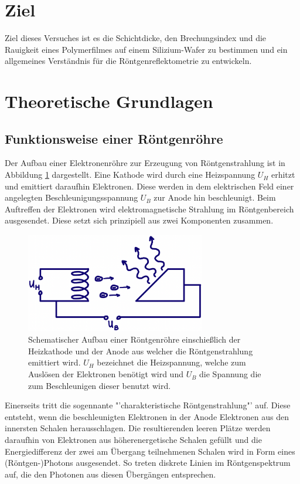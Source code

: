 \section{Ziel}
    Ziel dieses Versuches ist es die Schichtdicke, den Brechungsindex und
    die Rauigkeit eines Polymerfilmes auf einem Silizium-Wafer zu bestimmen
    und ein allgemeines Verständnis für die Röntgenreflektometrie zu entwickeln.
\section{Theoretische Grundlagen}
    \subsection{Funktionsweise einer Röntgenröhre}
        Der Aufbau einer Elektronenröhre zur Erzeugung von Röntgenstrahlung ist in Abbildung \ref{fig:Rohr} dargestellt.
        Eine Kathode wird durch eine Heizspannung $U_H$ erhitzt und emittiert daraufhin Elektronen.
        Diese werden in dem elektrischen Feld einer angelegten Beschleunigungsspannung $U_B$ zur Anode hin beschleunigt.
        Beim Auftreffen der Elektronen wird elektromagnetische Strahlung im Röntgenbereich ausgesendet.
        Diese setzt sich prinzipiell aus zwei Komponenten zusammen.
        \begin{figure}[h]
            \centering
            \includegraphics[width = 0.7\textwidth]{pictures/Rohr.png}
            \caption{Schematischer Aufbau einer Röntgenröhre einschießlich der Heizkathode und
                        der Anode aus welcher die Röntgenstrahlung emittiert wird.
                        $U_H$ bezeichnet die Heizspannung, welche zum Auslösen der Elektronen benötigt wird und
                        $U_B$ die Spannung die zum Beschleunigen dieser benutzt wird.}
            \label{fig:Rohr}
        \end{figure}
        Einerseits tritt die sogennante "'charakteristische Röntgenstrahlung"' auf.
        Diese entsteht, wenn die beschleunigten Elektronen in der Anode Elektronen aus den innersten Schalen herausschlagen.
        Die resultierenden leeren Plätze werden daraufhin von Elektronen aus höherenergetische Schalen gefüllt und die Energiedifferenz
        der zwei am Übergang teilnehmenen Schalen wird in Form eines (Röntgen-)Photons ausgesendet.
        So treten diskrete Linien im Röntgenspektrum auf, die den Photonen aus diesen Übergängen entsprechen.

